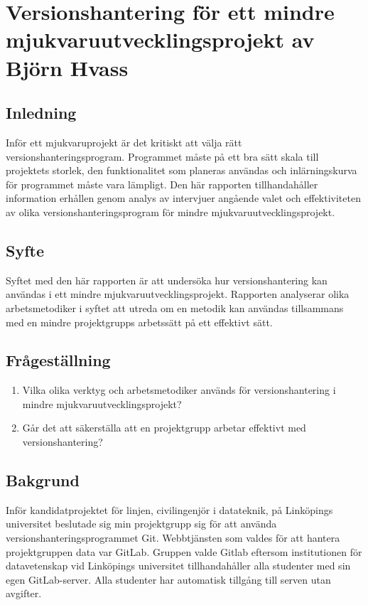 \chapter{Versionshantering för ett mindre mjukvaruutvecklingsprojekt av Björn Hvass}


%
%
%
%
%
%
%
%
%
%
%

\section{Inledning}
Inför ett mjukvaruprojekt är det kritiskt att välja rätt versionshanteringsprogram. Programmet måste på ett bra sätt skala till projektets storlek, den funktionalitet som planeras användas och inlärningskurva för programmet måste vara lämpligt. Den här rapporten tillhandahåller information erhållen genom analys av intervjuer angående valet och effektiviteten av olika versionshanteringsprogram för mindre mjukvaruutvecklingsprojekt.

\section{Syfte}
Syftet med den här rapporten är att undersöka hur versionshantering kan användas i ett mindre mjukvaruutvecklingsprojekt. Rapporten analyserar olika arbetsmetodiker i syftet att utreda om en metodik kan användas tillsammans med en mindre projektgrupps arbetssätt på ett effektivt sätt.

\section{Frågeställning}
\begin{enumerate}
    \item Vilka olika verktyg och arbetsmetodiker används för versionshantering i mindre mjukvaruutvecklingsprojekt?
    \item Går det att säkerställa att en projektgrupp arbetar effektivt med versionshantering?
\end{enumerate}

\section{Bakgrund}
Inför kandidatprojektet för linjen, civilingenjör i datateknik, på Linköpings universitet beslutade sig min projektgrupp sig för att använda versionshanteringsprogrammet Git.
Webbtjänsten som valdes för att hantera projektgruppen data var GitLab. Gruppen valde Gitlab eftersom institutionen för datavetenskap vid Linköpings universitet tillhandahåller alla studenter med sin egen GitLab-server. Alla studenter har automatisk tillgång till serven utan avgifter.

